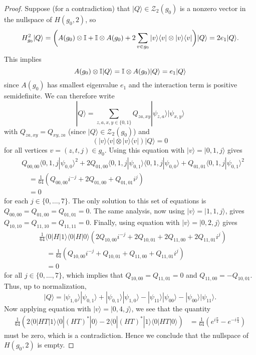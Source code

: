 \documentclass[../thesis-main/thesis-main]{subfiles}
\begin{document}
\begin{proof}
Suppose (for a contradiction) that $|Q\rangle\in\mathcal{Z}_{2}(g_{0})$ is a nonzero vector in the nullspace of $H(g_{0},2)$, so 
\[
H_{g_{0}}^{2}|Q\rangle=\bigg(A(g_{0})\otimes\mathbb{I}+\mathbb{I}\otimes A(g_{0})+2\sum_{v\in g_{0}}|v\rangle\langle v|\otimes|v\rangle\langle v|\bigg)|Q\rangle=2e_{1}|Q\rangle.
\]
This implies 
\[
A(g_{0})\otimes\mathbb{I}|Q\rangle=\mathbb{I}\otimes A(g_{0})|Q\rangle=e_{1}|Q\rangle
\]
since $A(g_0)$ has smallest eigenvalue $e_1$ and the interaction term is positive semidefinite. We can therefore write 
\[
|Q\rangle=\sum_{z,a,x,y\in\{0,1\}}Q_{za,xy}|\psi_{z,a}\rangle|\psi_{x,y}\rangle
\]
with $Q_{za,xy}=Q_{xy,za}$ (since $|Q\rangle\in\mathcal{Z}_{2}(g_{0})$) and 
\begin{equation}
\left(|v\rangle\langle v|\otimes|v\rangle\langle v|\right)|Q\rangle=0\label{eq:eqn_twoparticleannihilate}
\end{equation}
for all vertices $v=(z,t,j)\in g_{0}.$ Using this equation with
$|v\rangle=|0,1,j\rangle$ gives 
\begin{align*}
&Q_{00,00}\langle0,1,j|\psi_{0,0}\rangle^{2}  +2Q_{01,00}\langle0,1,j|\psi_{0,1}\rangle\langle0,1,j|\psi_{0,0}\rangle+Q_{01,01}\langle0,1,j|\psi_{0,1}\rangle^{2}\\
 &\quad =\frac{1}{64}\left(Q_{00,00}i^{-j}+2Q_{01,00}+Q_{01,01}i^{j}\right)\\
 &\quad =0
\end{align*}
for each $j\in\{0,\ldots,7\}$. The only solution to this set of equations is $Q_{00,00}=Q_{01,00}=Q_{01,01}=0$. The same analysis, now using $|v\rangle=|1,1,j\rangle$, gives $Q_{10,10}=Q_{11,10}=Q_{11,11}=0$. Finally, using equation  with $|v\rangle=|0,2,j\rangle$ gives
\begin{align*}
 & \frac{1}{64}\langle0|H|1\rangle\langle0|H|0\rangle\left(2Q_{10,00}i^{-j}+2Q_{10,01}+2Q_{11,00}+2Q_{11,01}i^{j}\right)\\
 &\quad =\frac{1}{64}\left(Q_{10,00}i^{-j}+Q_{10,01}+Q_{11,00}+Q_{11,01}i^{j}\right)\\
 &\quad =0
\end{align*}
for all $j\in\{0,\ldots,7\}$, which implies that $Q_{10,00}=Q_{11,01}=0$ and $Q_{11,00}=-Q_{10,01}$. Thus, up to normalization, 
\[
|Q\rangle=|\psi_{1,0}\rangle|\psi_{0,1}\rangle+|\psi_{0,1}\rangle|\psi_{1,0}\rangle-|\psi_{11}\rangle|\psi_{00}\rangle-|\psi_{00}\rangle|\psi_{11}\rangle.
\]
Now applying equation  with $|v\rangle=|0,4,j\rangle$, we see that the quantity 
\begin{align*}
\frac{1}{64}\left(2\langle0|HT|1\rangle\langle0|(HT)^{*}|0\rangle-2\langle0|(HT)^{*}|1\rangle\langle0|HT|0\rangle\right) & =\frac{1}{64}\left(e^{i\frac{\pi}{4}}-e^{-i\frac{\pi}{4}}\right)
\end{align*}
must be zero, which is a contradiction. Hence we conclude that the nullspace of $H(g_{0},2)$ is empty.
\end{proof}
\end{document}
